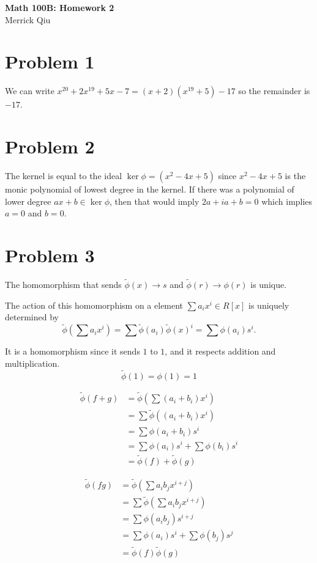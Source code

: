 \documentclass{article}
\begin{document}
\begin{center}
	\huge{\bf Math 100B: Homework 2} \\
	Merrick Qiu
\end{center}

\section*{Problem 1}
We can write $x^{20}+2x^{19} + 5x-7 = (x+2)(x^{19} +5) - 17$
so the remainder is $-17$.
\newpage 

\section*{Problem 2}
The kernel is equal to the ideal 
$\ker \phi = (x^2-4x+5)$
since $x^2-4x+5$ is the monic polynomial of lowest degree
in the kernel.
If there was a polynomial of lower degree 
$ax+b \in \ker \phi$,
then that would imply
$2a +ia + b = 0$ which implies 
$a = 0$ and $b = 0$.
\newpage 

\section*{Problem 3}
The homomorphism
that sends $\tilde{\phi}(x) \to s$
and $\tilde{\phi}(r) \to \phi(r)$ is unique.

The action of this homomorphism on 
a element $\sum a_ix^i \in R[x]$
is uniquely determined by
\[
	\tilde{\phi}\left(\sum a_ix^i\right) =
	\sum \tilde{\phi}(a_i)\tilde{\phi}(x)^i =
	\sum \phi(a_i)s^i.
\]

It is a homomorphism since it sends $1$ to $1$, and it respects
addition and multiplication.
\[
	\tilde{\phi}(1) = \phi(1) = 1
\]

\begin{align*}
	\tilde{\phi}(f+g) &=\tilde{\phi}\left(\sum (a_i+b_i)x^i\right) \\
	&= \sum \tilde{\phi}((a_i+b_i)x^i) \\
	&= \sum \phi(a_i+b_i)s^i \\
	&= \sum \phi(a_i)s^i + \sum \phi(b_i)s^i \\
	&= \tilde{\phi}(f) + \tilde{\phi}(g)
\end{align*}

\begin{align*}
	\tilde{\phi}(fg) &= \tilde{\phi}\left(\sum a_ib_jx^{i+j} \right) \\
	&= \sum \tilde{\phi}\left(\sum a_ib_jx^{i+j}\right) \\
	&= \sum \phi(a_ib_j)s^{i+j} \\
	&= \sum \phi(a_i)s^i + \sum \phi(b_j)s^j \\
	&= \tilde{\phi}(f)\tilde{\phi}(g)
\end{align*}
\newpage 
\end{document}
